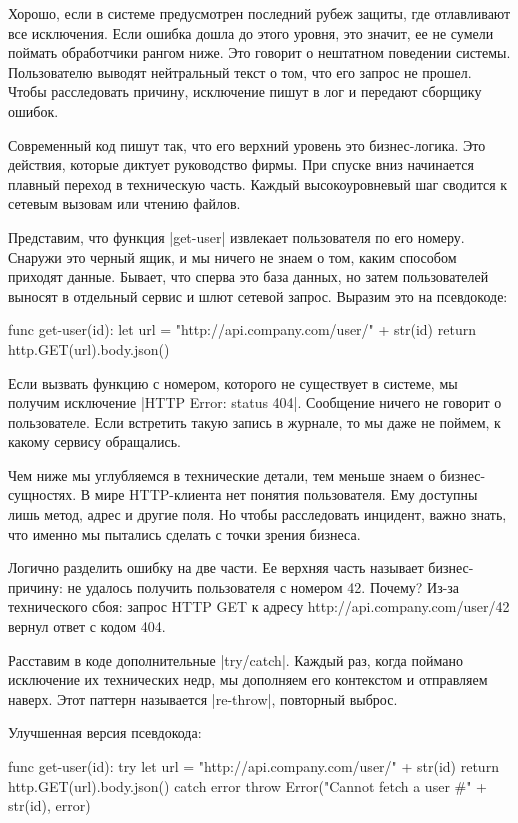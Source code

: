Хорошо, если в системе предусмотрен последний рубеж защиты, где отлавливают все
исключения. Если ошибка дошла до этого уровня, это значит, ее не сумели поймать
обработчики рангом ниже. Это говорит о нештатном поведении системы. Пользователю
выводят нейтральный текст о том, что его запрос не прошел. Чтобы расследовать
причину, исключение пишут в лог и передают сборщику ошибок.

Современный код пишут так, что его верхний уровень это бизнес-логика. Это
действия, которые диктует руководство фирмы. При спуске вниз начинается плавный
переход в техническую часть. Каждый высокоуровневый шаг сводится к сетевым
вызовам или чтению файлов.

Представим, что функция \spverb|get-user| извлекает пользователя по его номеру. Снаружи
это черный ящик, и мы ничего не знаем о том, каким способом приходят
данные. Бывает, что сперва это база данных, но затем пользователей выносят в
отдельный сервис и шлют сетевой запрос. Выразим это на псевдокоде:

\begin{code}
func get-user(id):
  let url = "http://api.company.com/user/" + str(id)
  return http.GET(url).body.json()
\end{code}

Если вызвать функцию с номером, которого не существует в системе, мы получим
исключение \spverb|HTTP Error: status 404|. Сообщение ничего не говорит о
пользователе. Если встретить такую запись в журнале, то мы даже не поймем, к
какому сервису обращались.

Чем ниже мы углубляемся в технические детали, тем меньше знаем о
бизнес-сущностях. В мире HTTP-клиента нет понятия пользователя. Ему доступны
лишь метод, адрес и другие поля. Но чтобы расследовать инцидент, важно знать,
что именно мы пытались сделать с точки зрения бизнеса.

Логично разделить ошибку на две части. Ее верхняя часть называет бизнес-причину:
не удалось получить пользователя с номером 42. Почему? Из-за технического сбоя:
запрос HTTP GET к адресу http://api.company.com/user/42 вернул ответ с кодом
404.

Расставим в коде дополнительные \spverb|try/catch|. Каждый раз, когда поймано
исключение их технических недр, мы дополняем его контекстом и отправляем
наверх. Этот паттерн называется \spverb|re-throw|, повторный выброс.

Улучшенная версия псевдокода:

\begin{code}
func get-user(id):
  try {
    let url = "http://api.company.com/user/" + str(id)
    return http.GET(url).body.json()
  } catch error {
    throw Error("Cannot fetch a user #" + str(id), error)
  }
\end{code}

